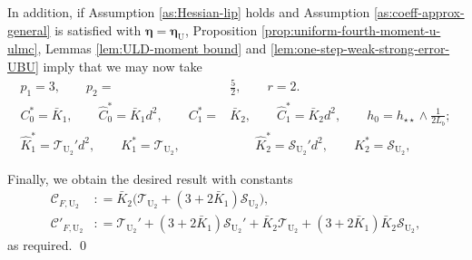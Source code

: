 \documentclass[12pt]{article}
\newenvironment{redtext}
  {\color{black}\ignorespaces}
  {\ignorespacesafterend}
\numberwithin{equation}{section}
\renewenvironment{proof}%
  {\begin{trivlist}%
   \item[]\ignorespaces}%
  {\qed\end{trivlist}}
\begin{document}
\begin{redtext}
\begin{proof}
In addition, if Assumption \ref{as:Hessian-lip} holds and  Assumption \ref{as:coeff-approx-general} is satisfied with $\boldsymbol{\eta}=\boldsymbol{\eta}_{\mathrm{U}}$, Proposition \ref{prop:uniform-fourth-moment-u-ulmc}, Lemmas \ref{lem:ULD-moment bound} and \ref{lem:one-step-weak-strong-error-UBU} imply that we may now take
\begin{align}
p_1=3,
\qquad
p_2=&\tfrac52,
\qquad
r=2.
\\
C_0^*=\bar K_1,
\qquad
\hat C_0^*=\bar K_1d^2,
\qquad
C_1^*=&\bar K_2,
\qquad
\hat C_1^*=\bar K_2d^2,
\qquad
h_0=h_{\star\star}\wedge \tfrac{1}{2L_b};
\\
\hat K_1^*=\mathcal T_{\mathrm{U}_2}'d^2,
\qquad
K_1^*=\mathcal T_{\mathrm{U}_2},
&\qquad
\hat K_2^*=\mathcal S_{\mathrm{U}_2}'d^2,
\qquad
K_2^*=\mathcal S_{\mathrm{U}_2},
\end{align}

Finally, we obtain the desired result with constants
\begin{equation}\label{eq:constants-c-f-U2}
\begin{aligned}
\mathcal C_{F,{\mathrm{U}_2}}&:
=
\bar K_2\big(\mathcal{T}_{\mathrm{U}_2}
+
(3+2\bar K_1)\mathcal{S}_{\mathrm{U}_2}\big),
\\
\mathcal C'_{F,{\mathrm{U}_2}}&:
=
\mathcal{T}_{\mathrm{U}_2}'
+
(3+2\bar K_1)\mathcal{S}_{\mathrm{U}_2}'
+
\bar K_2\mathcal{T}_{\mathrm{U}_2}
+
(3+2\bar K_1)\bar K_2\mathcal{S}_{\mathrm{U}_2},
\end{aligned}
\end{equation}
as required.
%
%
\end{proof}

\end{redtext}
\end{document}
